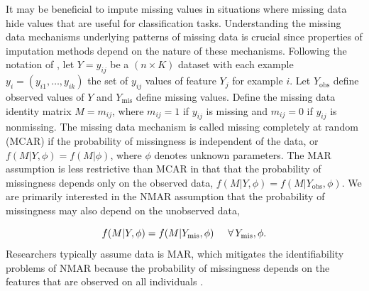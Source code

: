 \documentclass[10pt]{book}
\theoremstyle{definition}
\begin{document}
It may be beneficial to impute missing values in situations where missing data hide values that are useful for classification tasks. Understanding the missing data mechanisms underlying patterns of missing data is crucial since properties of imputation methods depend on the nature of these mechanisms. Following the notation of \cite{little2014}, let $Y = y_{ij}$ be a $(n \times K)$ dataset with each example $y_i = (y_{i1}, \ldots, y_{ik})$ the set of $y_{ij}$ values of feature $Y_j$ for example $i$. Let $Y_{\mathrm{obs}}$ define observed values of $Y$ and $Y_{\mathrm{mis}}$ define missing values. Define the missing data identity matrix $M = m_{ij}$, where $m_{ij} = 1$ if $y_{ij}$ is missing and $m_{ij} = 0$ if $y_{ij}$ is nonmissing. The missing data mechanism is called missing completely at random (MCAR) if the probability of missingness is independent of the data, or $f(M | Y, \phi) = f(M | \phi)$, where $\phi$ denotes unknown parameters. The MAR assumption is less restrictive than MCAR in that that the probability of missingness depends only on the observed data, $f(M | Y, \phi) = f(M | Y_{\mathrm{obs}}, \phi)$. We are primarily interested in the NMAR assumption that the probability of missingness may also depend on the unobserved data, 

\begin{equation}\label{1.1}
f(M | Y, \phi) = f(M | Y_{\mathrm{mis}}, \phi) \hspace{5mm} \forall \,Y_{\mathrm{mis}}, \phi.
\end{equation} Researchers typically assume data is MAR, which mitigates the identifiability problems of NMAR because the probability of missingness depends on the features that are observed on all individuals \citep{tsiatis2007}. 
				
 \label{section:techniques} 
\end{document}
